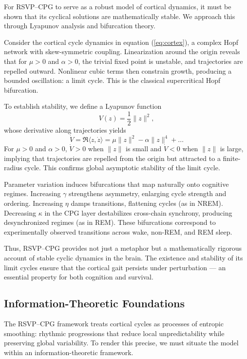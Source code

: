 \documentclass{article}
\begin{document}
For RSVP--CPG to serve as a robust model of cortical dynamics, it must be shown that its cyclical solutions are mathematically stable. We approach this through Lyapunov analysis and bifurcation theory.

Consider the cortical cycle dynamics in equation (\ref{eq:cortex}), a complex Hopf network with skew-symmetric coupling. Linearization around the origin reveals that for $\mu > 0$ and $\alpha > 0$, the trivial fixed point is unstable, and trajectories are repelled outward. Nonlinear cubic terms then constrain growth, producing a bounded oscillation: a limit cycle. This is the classical supercritical Hopf bifurcation.

To establish stability, we define a Lyapunov function
\begin{equation}
V(z) = \frac{1}{2}\|z\|^2,
\end{equation}
whose derivative along trajectories yields
\begin{equation}
\dot V = \Re\langle z, \dot z \rangle
= \mu \|z\|^2 - \alpha \|z\|^4 + \ldots
\end{equation}
For $\mu > 0$ and $\alpha > 0$, $\dot V > 0$ when $\|z\|$ is small and $\dot V < 0$ when $\|z\|$ is large, implying that trajectories are repelled from the origin but attracted to a finite-radius cycle. This confirms global asymptotic stability of the limit cycle.

Parameter variation induces bifurcations that map naturally onto cognitive regimes. Increasing $\gamma$ strengthens asymmetry, enlarging cycle strength and ordering. Increasing $\eta$ damps transitions, flattening cycles (as in NREM). Decreasing $\kappa$ in the CPG layer destabilizes cross-chain synchrony, producing desynchronized regimes (as in REM). These bifurcations correspond to experimentally observed transitions across wake, non-REM, and REM sleep.

Thus, RSVP--CPG provides not just a metaphor but a mathematically rigorous account of stable cyclic dynamics in the brain. The existence and stability of its limit cycles ensure that the cortical gait persists under perturbation — an essential property for both cognition and survival.


\subsection{Information-Theoretic Foundations}

The RSVP--CPG framework treats cortical cycles as processes of entropic smoothing: rhythmic progressions that reduce local unpredictability while preserving global variability. To render this precise, we must situate the model within an information-theoretic framework.
\end{document}
